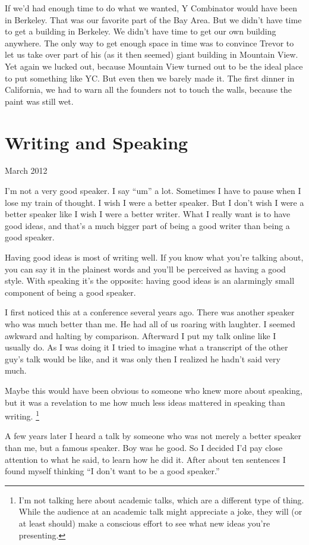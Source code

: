 \documentclass[12pt]{book}
\begin{document}
If we'd had enough time to do what we wanted, Y Combinator would have
been in Berkeley. That was our favorite part of the Bay Area. But we
didn't have time to get a building in Berkeley. We didn't have time to
get our own building anywhere. The only way to get enough space in time
was to convince Trevor to let us take over part of his (as it then
seemed) giant building in Mountain View. Yet again we lucked out,
because Mountain View turned out to be the ideal place to put something
like YC. But even then we barely made it. The first dinner in
California, we had to warn all the founders not to touch the walls,
because the paint was still wet.
\chapter{Writing and Speaking}

March 2012

I'm not a very good speaker. I say ``um'' a lot. Sometimes I have to
pause when I lose my train of thought. I wish I were a better speaker.
But I don't wish I were a better speaker like I wish I were a better
writer. What I really want is to have good ideas, and that's a much
bigger part of being a good writer than being a good speaker.

Having good ideas is most of writing well. If you know what you're
talking about, you can say it in the plainest words and you'll be
perceived as having a good style. With speaking it's the opposite:
having good ideas is an alarmingly small component of being a good
speaker.

I first noticed this at a conference several years ago. There was
another speaker who was much better than me. He had all of us roaring
with laughter. I seemed awkward and halting by comparison. Afterward I
put my talk online like I usually do. As I was doing it I tried to
imagine what a transcript of the other guy's talk would be like, and it
was only then I realized he hadn't said very much.

Maybe this would have been obvious to someone who knew more about
speaking, but it was a revelation to me how much less ideas mattered in
speaking than writing. \footnote{I'm not talking here about academic talks, which are a different
type of thing. While the audience at an academic talk might appreciate a
joke, they will (or at least should) make a conscious effort to see what
new ideas you're presenting.}

A few years later I heard a talk by someone who was not merely a better
speaker than me, but a famous speaker. Boy was he good. So I decided I'd
pay close attention to what he said, to learn how he did it. After about
ten sentences I found myself thinking ``I don't want to be a good
speaker.''
\end{document}
